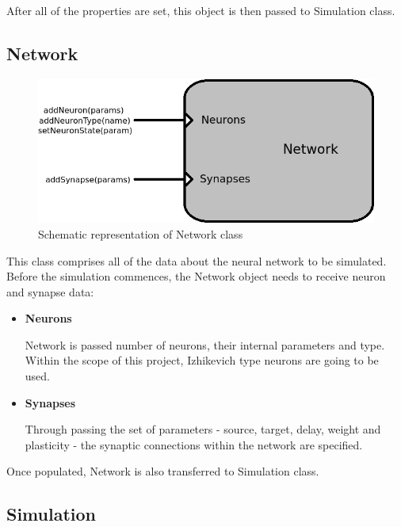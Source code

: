 After all of the properties are set, this object is then passed to Simulation class.

\subsection{Network}

\begin{figure}[h!]
\begin{center}
\includegraphics[scale = 0.7]{images/background/network_scheme.png}
\end{center}
\caption{Schematic representation of Network class}
\end{figure}

This class comprises all of the data about the neural network to be simulated. Before the simulation commences, the Network object needs to receive neuron and synapse data:

\begin{itemize}
\item{\textbf{Neurons}}

Network is passed number of neurons, their internal parameters and type. Within the scope of this project, Izhikevich type neurons are going to be used.

\item{\textbf{Synapses}}

Through passing the set of parameters - source, target, delay, weight and plasticity - the synaptic connections within the network are specified.
\end{itemize}

Once populated, Network is also transferred to Simulation class.

\subsection{Simulation}

